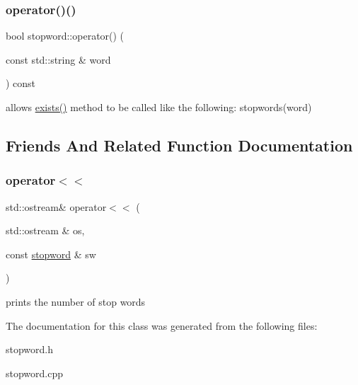 \subsubsection{\texorpdfstring{operator()()}{operator()()}}
{\footnotesize\ttfamily bool stopword\+::operator() (\begin{DoxyParamCaption}\item[{const std\+::string \&}]{word }\end{DoxyParamCaption}) const}

allows \hyperlink{classstopword_a11210085752c2b3d63055490c13b6666}{exists()} method to be called like the following\+: stopwords(word) 

\subsection{Friends And Related Function Documentation}
\mbox{\label{classstopword_a80e1d6c776f6a931100b5ea063e3a6ea}} 
\subsubsection{\texorpdfstring{operator$<$$<$}{operator<<}}
{\footnotesize\ttfamily std\+::ostream\& operator$<$$<$ (\begin{DoxyParamCaption}\item[{std\+::ostream \&}]{os,  }\item[{const \hyperlink{classstopword}{stopword} \&}]{sw }\end{DoxyParamCaption})\hspace{0.3cm}{\ttfamily [friend]}}

prints the number of stop words 

The documentation for this class was generated from the following files\+:\begin{DoxyCompactItemize}
\item 
stopword.\+h\item 
stopword.\+cpp\end{DoxyCompactItemize}
